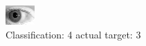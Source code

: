 \begin{figure}[h!]
\begin{center}
\includegraphics[width=0.60\columnwidth]{figures/ID321_class_4_target_3.png}
\end{center}
\caption{ Classification: 4 actual target: 3}
\label{fig:ID321_class_4_target_3}
\end{figure}
